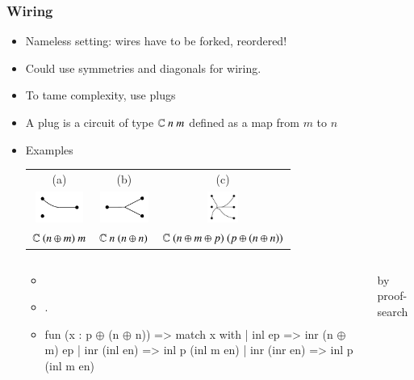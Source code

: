 \documentclass[9pt]{beamer}
\begin{document}
\begin{frame}[fragile]
  \frametitle{Wiring}
  \begin{itemize}
  \item Nameless setting: wires have to be forked, reordered!
  \item Could use symmetries and diagonals for wiring.

    \pause

  \item To tame complexity, use \alert{plugs}
  \item A plug is a circuit of type $\mathbb{C}~n~m$ defined as a \alert{map} from $m$ to $n$

    \pause
  \item Examples
    \begin{center}
      \begin{tabular}{ccc}
        (a) & (b) & (c) \\ 
        \includegraphics[width=0.2\linewidth, height=1cm]{figs/plugs_b.pdf}&
        \includegraphics[width=0.2\linewidth, height=1cm]{figs/plugs_a.pdf}&
        \includegraphics[width=0.2\linewidth, height=1cm]{figs/plugs_c.pdf}\\
        $\mathbb{C}~(n \oplus m)~m$ &
        $\mathbb{C}~n~(n\oplus n)$ &
        $\mathbb{C}~(n \oplus m \oplus p)~(p \oplus (n \oplus n))$ \\
      \end{tabular}
    \end{center}
    \pause 
    \begin{columns}[c]
      \begin{itemize}
      \item[a)] 
      \item[b)] .
        \vspace{-0.8em}
      \item[c)]
        \begin{coq}
fun (x : p $\oplus$ (n $\oplus$ n)) => match x with
| inl ep => inr (n $\oplus$ m) ep
| inr (inl en) => inl p (inl m en)
| inr (inr en) => inl p (inl m en)
        \end{coq}
      \end{itemize}
      
      by \alert{proof-search}
    \end{columns}
  \end{itemize}
\end{frame}
\end{document}

